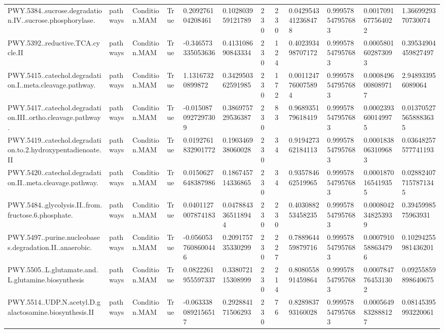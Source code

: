 \begin{longtable}{llllllllllll}
PWY.5384..sucrose.degradation.IV..sucrose.phosphorylase. & pathways & Condition.MAM & True & 0.209276104208461 & 0.102803959121789 & 230 & 230 & 0.0429543412368478 & 0.999578547957683 & 0.0017091677564022 & 1.3669929370730074 \\
PWY.5392..reductive.TCA.cycle.II & pathways & Condition.MAM & True & -0.346573335053636 & 0.413108690843334 & 230 & 124 & 0.402393498707172 & 0.999578547957683 & 0.0005801602873093 & 0.39534904459827497 \\
PWY.5415..catechol.degradation.I..meta.cleavage.pathway. & pathways & Condition.MAM & True & 1.13167320899872 & 0.342950362591985 & 230 & 172 & 0.0011247760075894 & 0.999578547957683 & 0.0008496008089717 & 2.948933956089064 \\
PWY.5417..catechol.degradation.III..ortho.cleavage.pathway. & pathways & Condition.MAM & True & -0.0150870927297309 & 0.386975729536387 & 230 & 83 & 0.968935179618419 & 0.999578547957683 & 0.0002393600149975 & 0.013705275658883635 \\
PWY.5419..catechol.degradation.to.2.hydroxypentadienoate.II & pathways & Condition.MAM & True & 0.0192761832901772 & 0.190346938060028 & 230 & 34 & 0.919427362184113 & 0.999578547957683 & 0.0001838063109683 & 0.03648257577741193 \\
PWY.5420..catechol.degradation.II..meta.cleavage.pathway. & pathways & Condition.MAM & True & 0.0150627648387986 & 0.186745714336865 & 230 & 34 & 0.935784662519965 & 0.999578547957683 & 0.0001870165419355 & 0.028824077157871345 \\
PWY.5484..glycolysis.II..from.fructose.6.phosphate. & pathways & Condition.MAM & True & 0.0401127007874183 & 0.0478843365118944 & 230 & 230 & 0.403088253458235 & 0.999578547957683 & 0.0008042348253939 & 0.3945998575963931 \\
PWY.5497..purine.nucleobases.degradation.II..anaerobic. & pathways & Condition.MAM & True & -0.0560537608600446 & 0.209175735330299 & 230 & 227 & 0.788964459879716 & 0.999578547957683 & 0.0007910588634796 & 0.10294255981436201 \\
PWY.5505..L.glutamate.and.L.glutamine.biosynthesis & pathways & Condition.MAM & True & 0.0822261955597337 & 0.338072115308999 & 230 & 214 & 0.808055891459864 & 0.999578547957683 & 0.0007847764531302 & 0.09255859898640675 \\
PWY.5514..UDP.N.acetyl.D.galactosamine.biosynthesis.II & pathways & Condition.MAM & True & -0.0633380892156517 & 0.292884171506293 & 230 & 76 & 0.828983793160028 & 0.999578547957683 & 0.0005649832888127 & 0.08145395993220061 \\

\end{longtable}
